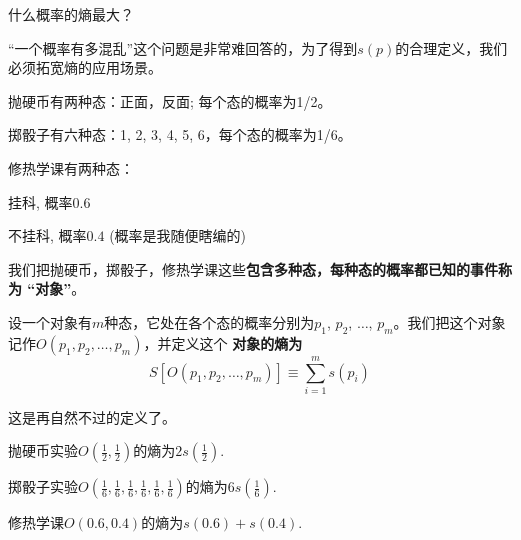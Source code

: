 \documentclass[CJK]{beamer}
\begin{document}
\begin{frame}
\bch
{}
什么概率的熵最大？

\ech
\end{frame}


\begin{frame}
\bch

“一个概率有多混乱”这个问题是非常难回答的，为了得到$s(p)$的合理定义，我们必须拓宽熵的应用场景。

\ech
\end{frame}


\begin{frame}
\bch
\bitem
\item{抛硬币有两种态：正面，反面; 每个态的概率为1/2。

}
\item{掷骰子有六种态：1, 2, 3, 4, 5, 6，每个态的概率为1/6。

}
\item{修热学课有两种态：

挂科, 概率$0.6$ 

不挂科, 概率$0.4$  {\hskip 0.5in} {\small (\bye 概率是我随便瞎编的)}
}
\eitem

我们把抛硬币，掷骰子，修热学课这些{\bf 包含多种态，每种态的概率都已知的事件称为 “对象”}。

\ech
\end{frame}

\begin{frame}
\bch
设一个对象有$m$种态，它处在各个态的概率分别为$p_1$, $p_2$, $\ldots$, $p_m$。我们把这个对象记作$O(p_1, p_2, \ldots, p_m)$，并定义这个{\bf \blue
对象的熵为
$$S\left[O(p_1, p_2, \ldots, p_m)\right] \equiv \sum_{i=1}^m  s(p_i)$$
}

这是再自然不过的定义了。

\skiplines

\bex
{\small 
抛硬币实验$O(\frac{1}{2},\frac{1}{2})$的熵为$2s(\frac{1}{2})$.

\skipline

掷骰子实验$O(\frac{1}{6},\frac{1}{6},\frac{1}{6},\frac{1}{6},\frac{1}{6},\frac{1}{6})$的熵为$6s(\frac{1}{6})$.

\skipline

修热学课$O(0.6, 0.4)$的熵为$s(0.6)+s(0.4)$.}

\eex
\ech
\end{frame}
\end{document}
